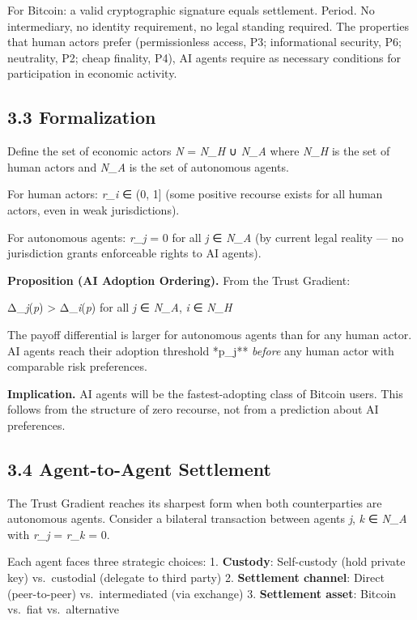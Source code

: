 \documentclass[12pt]{article}
\theoremstyle{definition}
\theoremstyle{remark}
\begin{document}
For Bitcoin: a valid cryptographic signature equals settlement. Period.
No intermediary, no identity requirement, no legal standing required.
The properties that human actors prefer (permissionless access, P3;
informational security, P6; neutrality, P2; cheap finality, P4), AI
agents require as necessary conditions for participation in economic
activity.

\subsection{3.3 Formalization}\label{formalization}

Define the set of economic actors \emph{N} = \emph{N\_H} ∪ \emph{N\_A}
where \emph{N\_H} is the set of human actors and \emph{N\_A} is the set
of autonomous agents.

For human actors: \emph{r\_i} ∈ (0, 1{]} (some positive recourse exists
for all human actors, even in weak jurisdictions).

For autonomous agents: \emph{r\_j} = 0 for all \emph{j} ∈ \emph{N\_A}
(by current legal reality --- no jurisdiction grants enforceable rights
to AI agents).

\textbf{Proposition (AI Adoption Ordering).} From the Trust Gradient:

Δ\_\emph{j}(\emph{p}) \textgreater{} Δ\_\emph{i}(\emph{p}) for all
\emph{j} ∈ \emph{N\_A}, \emph{i} ∈ \emph{N\_H}

The payoff differential is larger for autonomous agents than for any
human actor. AI agents reach their adoption threshold *p\_j**
\emph{before} any human actor with comparable risk preferences.

\textbf{Implication.} AI agents will be the fastest-adopting class of
Bitcoin users. This follows from the structure of zero recourse, not
from a prediction about AI preferences.

\subsection{3.4 Agent-to-Agent
Settlement}\label{agent-to-agent-settlement}

The Trust Gradient reaches its sharpest form when both counterparties
are autonomous agents. Consider a bilateral transaction between agents
\emph{j}, \emph{k} ∈ \emph{N\_A} with \emph{r\_j} = \emph{r\_k} = 0.

Each agent faces three strategic choices: 1. \textbf{Custody}:
Self-custody (hold private key) vs.~custodial (delegate to third party)
2. \textbf{Settlement channel}: Direct (peer-to-peer) vs.~intermediated
(via exchange) 3. \textbf{Settlement asset}: Bitcoin vs.~fiat
vs.~alternative
\end{document}
